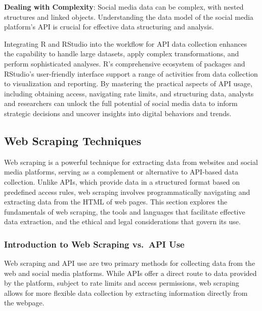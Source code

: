 \documentclass[
]{book}
\begin{document}
\textbf{Dealing with Complexity}: Social media data can be complex, with nested structures and linked objects. Understanding the data model of the social media platform's API is crucial for effective data structuring and analysis.

Integrating R and RStudio into the workflow for API data collection enhances the capability to handle large datasets, apply complex transformations, and perform sophisticated analyses. R's comprehensive ecosystem of packages and RStudio's user-friendly interface support a range of activities from data collection to visualization and reporting. By mastering the practical aspects of API usage, including obtaining access, navigating rate limits, and structuring data, analysts and researchers can unlock the full potential of social media data to inform strategic decisions and uncover insights into digital behaviors and trends.

\hypertarget{web-scraping-techniques}{%
\subsection*{Web Scraping Techniques}\label{web-scraping-techniques}}

Web scraping is a powerful technique for extracting data from websites and social media platforms, serving as a complement or alternative to API-based data collection. Unlike APIs, which provide data in a structured format based on predefined access rules, web scraping involves programmatically navigating and extracting data from the HTML of web pages. This section explores the fundamentals of web scraping, the tools and languages that facilitate effective data extraction, and the ethical and legal considerations that govern its use.

\hypertarget{introduction-to-web-scraping-vs.-api-use}{%
\subsubsection*{Introduction to Web Scraping vs.~API Use}\label{introduction-to-web-scraping-vs.-api-use}}

Web scraping and API use are two primary methods for collecting data from the web and social media platforms. While APIs offer a direct route to data provided by the platform, subject to rate limits and access permissions, web scraping allows for more flexible data collection by extracting information directly from the webpage.
\end{document}
